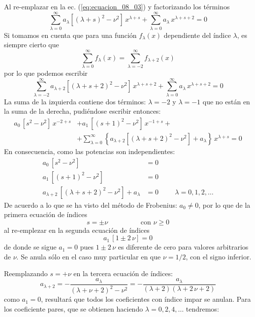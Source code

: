 Al re-emplazar en la ec. (\ref{eq:ecuacion_08_03}) y factorizando los términos
\[ \sum_{\lambda=0}^{\infty} a_{\lambda} \left[ (\lambda + s)^{2} - \nu^{2} \right] \, x^{\lambda + s} + \sum_{\lambda=0}^{\infty} a_{\lambda} \, x^{\lambda + s + 2} = 0 \]
Si tomamos en cuenta que para una función $f_{\lambda} (x)$ dependiente del índice $\lambda$, es siempre cierto que
\[ \sum_{\lambda=0}^{\infty} f_{\lambda} (x) = \sum_{\lambda=-2}^{\infty} f_{\lambda+2} (x) \]
por lo que podemos escribir
\[ \sum_{\lambda=-2}^{\infty} a_{\lambda+2} \left[ (\lambda + s + 2)^{2} - \nu^{2} \right] \, x^{\lambda + s + 2} + \sum_{\lambda=0}^{\infty} a_{\lambda} \, x^{\lambda + s + 2} = 0 \]
La suma de la izquierda contiene dos términos: $\lambda=-2$ y $\lambda=-1$ que no están en la suma de la derecha, pudiéndose escribir entonces:
\begin{align*}
a_{0} \, [s^{2} - \nu^{2}] \, x^{-2+s} &+ a_{1} \, [(s+1)^{2} - \nu^{2}] \, x^{-1+s} + \\
&+ \sum_{\lambda=0}^{\infty} \left\{ a_{\lambda+2} [(\lambda + s + 2)^{2} - \nu^{2}] + a_{\lambda} \right\} \, x^{\lambda + s} = 0
\end{align*}
En consecuencia, como las potencias son independientes:
\begin{align*}
a_{0} \, [s^{2} - \nu^{2}] &= 0 \\
a_{1} \, [(s + 1)^{2} - \nu^{2}] &= 0 \\
a_{\lambda+2} \, [(\lambda + s + 2)^{2} - \nu^{2}] + a_{\lambda} &= 0 \hspace{1cm} \lambda=0, 1, 2, \ldots
\end{align*}
De acuerdo a lo que se ha visto del método de Frobenius: $a_{0} \neq 0$, por lo que de la primera ecuación de índices
\begin{equation}
s = \pm \nu \hspace{2cm} \mbox{con } \nu \geq 0
\label{eq:ecuacion_08_04}
\end{equation}
al re-emplezar en la segunda ecuación de índices
\[ a_{1} \, [1 \pm 2 \, \nu] = 0 \]
de donde se sigue $a_{1} = 0$ pues $1 \pm 2 \, \nu$ es diferente de cero para valores arbitrarios de $\nu$. Se anula sólo en el caso muy particular en que $\nu = 1/2$, con el signo inferior.
\par
Reemplazando $s = + \nu$ en la tercera ecuación de índices:
\[ a_{\lambda+2} = - \dfrac{a_{\lambda}}{(\lambda + \nu + 2)^{2} - \nu^{2}} = - \dfrac{a_{\lambda}}{(\lambda + 2)(\lambda + 2 \, \nu + 2)} \]
como $a_{1} = 0$, resultará que todos los coeficientes con índice impar se anulan. Para los coeficiente pares, que se obtienen haciendo $\lambda = 0, 2, 4, \ldots$ tendremos:
